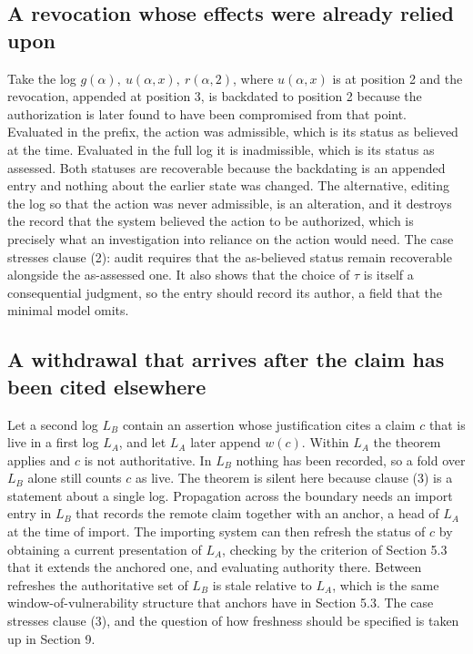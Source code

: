 \documentclass[11pt]{article}
\theoremstyle{plain}
\theoremstyle{definition}
\theoremstyle{remark}
\begin{document}
\subsection{A revocation whose effects were already relied upon}
Take the log $g(\alpha),\ u(\alpha,x),\ r(\alpha,2)$, where $u(\alpha,x)$ is at position 2 and the revocation, appended at position 3, is backdated to position 2 because the authorization is later found to have been compromised from that point. Evaluated in the prefix, the action was admissible, which is its status as believed at the time. Evaluated in the full log it is inadmissible, which is its status as assessed. Both statuses are recoverable because the backdating is an appended entry and nothing about the earlier state was changed. The alternative, editing the log so that the action was never admissible, is an alteration, and it destroys the record that the system believed the action to be authorized, which is precisely what an investigation into reliance on the action would need. The case stresses clause (2): audit requires that the as-believed status remain recoverable alongside the as-assessed one. It also shows that the choice of $\tau$ is itself a consequential judgment, so the entry should record its author, a field that the minimal model omits.

\subsection{A withdrawal that arrives after the claim has been cited elsewhere}
Let a second log $L_B$ contain an assertion whose justification cites a claim $c$ that is live in a first log $L_A$, and let $L_A$ later append $w(c)$. Within $L_A$ the theorem applies and $c$ is not authoritative. In $L_B$ nothing has been recorded, so a fold over $L_B$ alone still counts $c$ as live. The theorem is silent here because clause (3) is a statement about a single log. Propagation across the boundary needs an import entry in $L_B$ that records the remote claim together with an anchor, a head of $L_A$ at the time of import. The importing system can then refresh the status of $c$ by obtaining a current presentation of $L_A$, checking by the criterion of Section 5.3 that it extends the anchored one, and evaluating authority there. Between refreshes the authoritative set of $L_B$ is stale relative to $L_A$, which is the same window-of-vulnerability structure that anchors have in Section 5.3. The case stresses clause (3), and the question of how freshness should be specified is taken up in Section 9.
\end{document}
